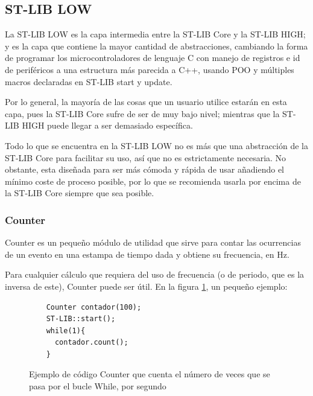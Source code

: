 \documentclass{report}
\begin{document}
\subsection{ST-LIB LOW}
La ST-LIB LOW es la capa intermedia entre la ST-LIB Core y la ST-LIB HIGH; y es la capa que contiene la mayor cantidad de abstracciones, cambiando la forma de programar los microcontroladores de lenguaje C con manejo de registros e id de periféricos a una estructura más parecida a C++, usando POO y múltiples macros declaradas en ST-LIB start y update. 
\par \vspace{0.3cm}
Por lo general, la mayoría de las cosas que un usuario utilice estarán en esta capa, pues la ST-LIB Core sufre de ser de muy bajo nivel; mientras que la ST-LIB HIGH puede llegar a ser demasiado específica. 
\par \vspace{0.3cm}
Todo lo que se encuentra en la ST-LIB LOW no es más que una abstracción de la ST-LIB Core para facilitar su uso, así que no es estrictamente necesaria. No obstante, esta diseñada para ser más cómoda y rápida de usar añadiendo el mínimo coste de proceso posible, por lo que se recomienda usarla por encima de la ST-LIB Core siempre que sea posible.

\subsubsection{Counter}
Counter es un pequeño módulo de utilidad que sirve para contar las ocurrencias de un evento en una estampa de tiempo dada y obtiene su frecuencia, en Hz. 
\par \vspace{0.3cm}
Para cualquier cálculo que requiera del uso de frecuencia (o de periodo, que es la inversa de este), Counter puede ser útil. En la figura \ref{CounterCode}, un pequeño ejemplo: 
\begin{figure}[H]
  \begin{lstlisting}
    Counter contador(100);
    ST-LIB::start();
    while(1){
      contador.count();
    }
  \end{lstlisting}
  \caption{Ejemplo de código Counter que cuenta el número de veces que se pasa por el bucle While, por segundo}
  \label{CounterCode}
\end{figure}
\par \vspace{0.3cm}
\end{document}
